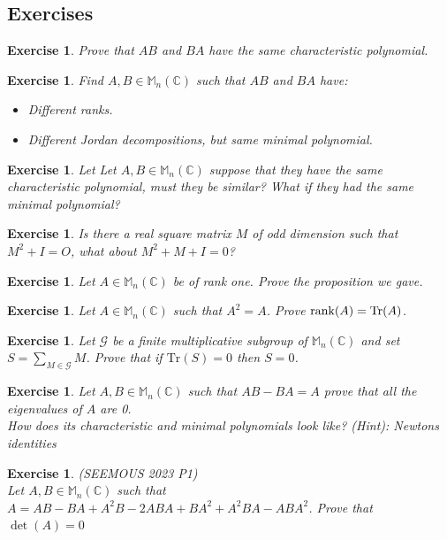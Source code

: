 \documentclass[12pt]{article}
\theoremstyle{definition}
\theoremstyle{remark}
\theoremstyle{plain}
\newtheorem{ex}[subsubsection]{Exercise}
\begin{document}
\subsection{Exercises}


\begin{ex}
    Prove that $AB$ and $BA$ have the same characteristic polynomial.
\end{ex}
\begin{ex}
    Find $A,B\in\mathbb{M}_n(\mathbb{C})$ such that $AB$ and $BA$ have:
    \begin{itemize}
        \item Different ranks.
        \item Different Jordan decompositions, but same minimal polynomial.
    \end{itemize}
\end{ex}
\begin{ex}
Let Let $A,B \in \mathbb{M}_n(\mathbb{C})$ suppose that they have the same characteristic polynomial, must they be similar? What if they had the same minimal polynomial?
\end{ex}
\begin{ex}
    Is there a real square matrix $M$ of odd dimension such that $M^2+I=O$, what about $M^2+M+I=0$?
\end{ex}
\begin{ex}
    Let $A\in \mathbb{M}_n(\mathbb{C})$ be of rank one. Prove the proposition we gave.
\end{ex}
\begin{ex}
    Let $A\in \mathbb{M}_n(\mathbb{C})$ such that $A^2=A$. Prove $\rank(A)=\mathrm{Tr}(A)$.
\end{ex}
\begin{ex}
    Let $\mathscr{G}$ be a finite multiplicative subgroup of $\mathbb{M}_n(\mathbb{C})$ and set $S=\sum \limits_{M\in \mathscr{G}} M$. Prove that if $\mathrm{Tr}(S)=0$ then $S=0$. 
\end{ex}
\begin{ex}
    Let $A,B \in \mathbb{M}_n(\mathbb{C})$ such that $AB-BA=A$ prove that all the eigenvalues of $A$ are 0.\\
    How does its characteristic and minimal polynomials look like?
    (Hint): Newtons identities
\end{ex}
\begin{ex}\textup{(SEEMOUS 2023 P1)}\\
Let $A,B \in \mathbb{M}_n(\mathbb{C})$ such that $  A=AB-BA+A^2B-2ABA+BA^2+A^2BA-ABA^2$. Prove that $\det(A)=0$
\end{ex}
\end{document}
